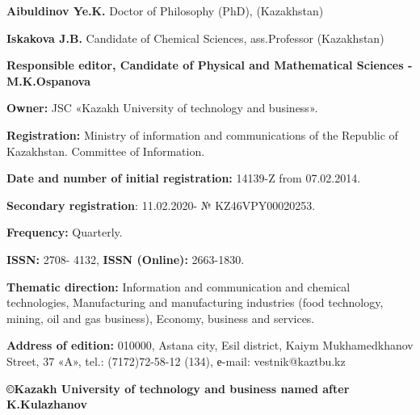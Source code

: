 {\textbf{Aibuldinov Ye.K.} Doctor of Philosophy (PhD), (Kazakhstan)

\textbf{Iskakova J.B.} Candidate of Chemical Sciences, ass.Professor
(Kazakhstan)

\begin{center}
\textbf{Responsible editor, Candidate of Physical and Mathematical
Sciences -M.K.Ospanova}
\end{center}

\textbf{Owner:} JSC «Kazakh University of technology and business».

\textbf{Registration:} Ministry of information and communications of the
Republic of Kazakhstan. Committee of Information.

\textbf{Date and number of initial registration:} 14139-Z from
07.02.2014.

\textbf{Secondary registration}: 11.02.2020- № KZ46VPY00020253.

\textbf{Frequency:} Quarterly.

\textbf{ISSN:} 2708- 4132, \textbf{ISSN (Online):} 2663-1830.

\textbf{Thematic direction:} Information and communication and chemical
technologies, Manufacturing and manufacturing industries (food
technology, mining, oil and gas business), Economy, business and services.

\textbf{Address of edition:} 010000, Astana city, Esil district, Kaiym
Mukhamedkhanov Street, 37 «A», tel.: (7172)72-58-12 (134),
е-mail: vestnik@kaztbu.kz
\vfill
\begin{center}
\textbf{\normalsize ©Kazakh University of technology and business named after K.Kulazhanov}
\end{center}
}
\pagebreak
